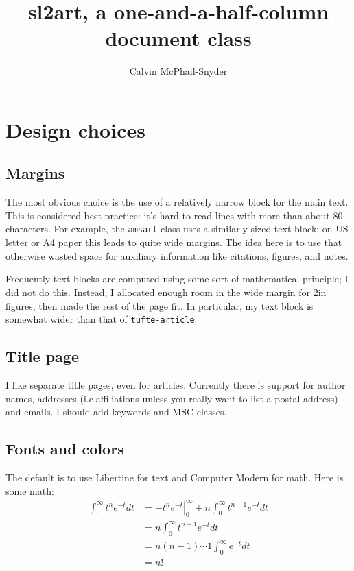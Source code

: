 \documentclass[margincite]{sl2art}
\title{sl2art, a one-and-a-half-column document class}
\author{Calvin McPhail-Snyder}
\begin{document}
\maketitle
\tableofcontents

\section{Design choices}

\subsection{Margins}
The most obvious choice is the use of a relatively narrow block for the main text.
This is considered best practice: it's hard to read lines with more than about 80 characters.
For example, the \texttt{amsart} class uses a similarly-sized text block; on US letter or A4 paper this leads to quite wide margins.
The idea here is to use that otherwise wasted space for auxiliary information like citations, figures, and notes.

Frequently text blocks are computed using some sort of mathematical principle; I did not do this.
Instead, I allocated enough room in the wide margin for 2in figures, then made the rest of the page fit.
In particular, my text block is somewhat wider than that of \texttt{tufte-article}.

\subsection{Title page}
I like separate title pages, even for articles.
Currently there is support for author names, addresses (i.e.\@ affiliations unless you really want to list a postal address) and emails.
I should add keywords and MSC classes.

\subsection{Fonts and colors}
The default is to use Libertine for text and Computer Modern for math.
Here is some math:
\begin{align*}
  \int_{0}^{\infty} t^{n} e^{-t} dt
  &=
  \left.- t^{n} e^{-t} \right|_{0}^{\infty}
  +
  n \int_{0}^{\infty} t^{n-1} e^{-t} dt
  \\
  &=
  n \int_{0}^{\infty} t^{n-1} e^{-t} dt
  \\
  &= n(n-1) \cdots 1 \int_{0}^{\infty} e^{-t} dt
  \\
  &= n!
\end{align*}
\end{document}
